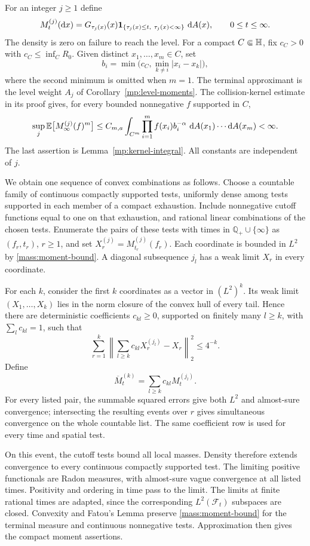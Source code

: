 For an integer $j\ge1$ define
\begin{equation}
 M_t^{(j)}(\mathop{}\!\mathrm{d} x)
 =G_{\tau_j(x)}(x)
   \mathbf 1_{\{\tau_j(x)\le t,\ \tau_j(x)<\infty\}}\,\mathop{}\!\mathrm{d} A(x),
 \qquad 0\le t\le\infty.
 \label{mass:approximants}
\end{equation}
The density is zero on failure to reach the level.  For a compact
$C\Subset\mathbb H$, fix $c_C>0$ with $c_C\le\inf_C R_0$.  Given distinct
$x_1,\ldots,x_m\in C$, set
\[
 b_i=\min\bigl(c_C,\min_{k\ne i}|x_i-x_k|\bigr),
\]
where the second minimum is omitted when $m=1$.
The terminal approximant is the level weight $A_j$ of
Corollary~\ref{mp:level-moments}.  The collision-kernel estimate in its
proof gives, for every bounded nonnegative $f$ supported in $C$,
\begin{equation}
 \sup_j\mathbb E\bigl[M_\infty^{(j)}(f)^m\bigr]
 \le C_{m,a}\int_{C^m}
       \prod_{i=1}^m f(x_i)b_i^{-\alpha}
       \,\mathop{}\!\mathrm{d} A(x_1)\cdots\mathop{}\!\mathrm{d} A(x_m)<\infty.
 \label{mass:moment-bound}
\end{equation}
The last assertion is Lemma~\ref{mp:kernel-integral}.
All constants are independent of $j$.

We obtain one sequence of convex combinations as follows.  Choose a
countable family of continuous compactly supported tests, uniformly
dense among tests supported in each member of a compact exhaustion.
Include nonnegative cutoff functions equal to one on that exhaustion,
and rational linear combinations of the chosen tests.  Enumerate the
pairs of these tests with times in $\mathbb Q_+\cup\{\infty\}$ as
$(f_r,t_r)$, $r\ge1$, and set
$X_r^{(j)}=M_{t_r}^{(j)}(f_r)$.
Each coordinate is bounded in $L^2$ by \eqref{mass:moment-bound}.
A diagonal subsequence $j_l$ has a weak limit $X_r$ in every coordinate.

For each $k$, consider the first $k$ coordinates as a vector in
$(L^2)^k$.  Its weak limit $(X_1,\ldots,X_k)$ lies in the norm closure
of the convex hull of every tail.  Hence there are deterministic
coefficients $c_{kl}\ge0$, supported on finitely many $l\ge k$, with
$\sum_lc_{kl}=1$, such that
\[
 \sum_{r=1}^k\left\|
       \sum_{l\ge k}c_{kl}X_r^{(j_l)}-X_r
                    \right\|_2^2\le4^{-k}.
\]
Define
\[
 \overline M_t^{(k)}=\sum_{l\ge k}c_{kl}M_t^{(j_l)}.
\]
For every listed pair, the summable squared errors give both $L^2$
and almost-sure convergence; intersecting the resulting events over
$r$ gives simultaneous convergence on the whole countable list.
The same coefficient row is used for every time and spatial test.

On this event, the cutoff tests bound all local masses.  Density therefore
extends convergence to every continuous compactly supported test.
The limiting positive functionals are Radon measures, with almost-sure
vague convergence at all listed times.  Positivity and ordering in time
pass to the limit.  The limits at finite rational times are adapted, since
the corresponding $L^2(\mathcal F_t)$ subspaces are closed.  Convexity and
Fatou's Lemma preserve \eqref{mass:moment-bound} for the terminal measure
and continuous nonnegative tests.  Approximation then gives the compact
moment assertions.

